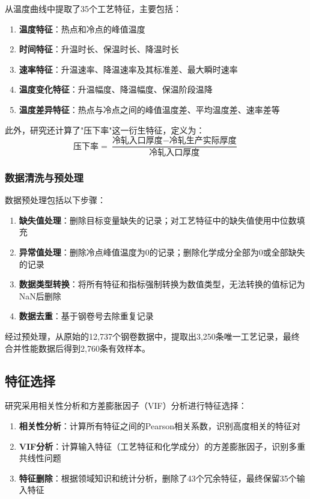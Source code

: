 \documentclass[12pt,a4paper]{article}
\begin{document}
从温度曲线中提取了35个工艺特征，主要包括：
\begin{enumerate}
\item \textbf{温度特征}：热点和冷点的峰值温度
\item \textbf{时间特征}：升温时长、保温时长、降温时长
\item \textbf{速率特征}：升温速率、降温速率及其标准差、最大瞬时速率
\item \textbf{温度变化特征}：升温幅度、降温幅度、保温阶段温降
\item \textbf{温度差异特征}：热点与冷点之间的峰值温度差、平均温度差、速率差等
\end{enumerate}

此外，研究还计算了"压下率"这一衍生特征，定义为：
\begin{equation}
\text{压下率} = \frac{\text{冷轧入口厚度} - \text{冷轧生产实际厚度}}{\text{冷轧入口厚度}}
\end{equation}

\subsubsection{数据清洗与预处理}

数据预处理包括以下步骤：
\begin{enumerate}
\item \textbf{缺失值处理}：删除目标变量缺失的记录；对工艺特征中的缺失值使用中位数填充
\item \textbf{异常值处理}：删除冷点峰值温度为0的记录；删除化学成分全部为0或全部缺失的记录
\item \textbf{数据类型转换}：将所有特征和指标强制转换为数值类型，无法转换的值标记为NaN后删除
\item \textbf{数据去重}：基于钢卷号去除重复记录
\end{enumerate}

经过预处理，从原始的12,737个钢卷数据中，提取出3,250条唯一工艺记录，最终合并性能数据后得到2,760条有效样本。

\subsection{特征选择}

研究采用相关性分析和方差膨胀因子（VIF）分析进行特征选择：
\begin{enumerate}
\item \textbf{相关性分析}：计算所有特征之间的Pearson相关系数，识别高度相关的特征对
\item \textbf{VIF分析}：计算输入特征（工艺特征和化学成分）的方差膨胀因子，识别多重共线性问题
\item \textbf{特征删除}：根据领域知识和统计分析，删除了43个冗余特征，最终保留35个输入特征
\end{enumerate}
\end{document}
